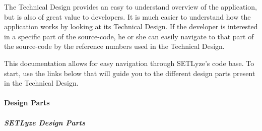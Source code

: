 \documentclass[letterpaper,10pt,english]{sphinxmanual}
\begin{document}
The Technical Design provides an easy to understand overview of the
application, but is also of great value to developers. It is much
easier to understand how the application works by looking at its
Technical Design. If the developer is interested in a specific part of
the source-code, he or she can easily navigate to that part of the
source-code by the reference numbers used in the Technical Design.

This documentation allows for easy navigation through SETLyze's code base.
To start, use the links below that will guide you to the different design
parts present in the Technical Design.


\paragraph{Design Parts}
\label{developer_guide:design-parts}

\subparagraph{SETLyze Design Parts}
\label{design_parts_index:setlyze-design-parts}\label{design_parts_index::doc}
\end{document}
